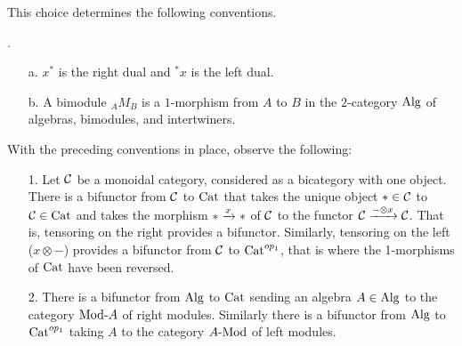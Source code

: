 \documentclass{amsart}
\begin{document}
This choice determines the following conventions.
\begin{definition}.
\begin{itemize}
\item[a.] $x^*$ is the right dual and ${}^*x$ is the left dual.
\item[b.] A bimodule ${}_A M_B$ is a $1$-morphism from $A$ to $B$ in the $2$-category $\mathrm{Alg}$ of algebras, bimodules, and intertwiners.
\end{itemize}
\end{definition}

\noindent With the preceding conventions in place, observe the following:
\begin{itemize}
\item[1.] Let $\mathcal C$ be a monoidal category, considered as a bicategory with one object.  There is a bifunctor from $\mathcal C$ to $\mathrm{Cat}$ that takes the unique object $\ast \in \mathcal C$ to $\mathcal C \in \mathrm{Cat}$ and takes the morphism $\ast \xrightarrow{x} \ast$ of $\mathcal C$ to the functor $\mathcal C \xrightarrow{- \otimes x} \mathcal C$.  That is, tensoring on the right provides a bifunctor.  Similarly, tensoring on the left ($x \otimes -$) provides a bifunctor from $\mathcal C$ to $\mathrm{Cat}^{op_1}$, that is where the 1-morphisms of $\mathrm{Cat}$ have been reversed.
\item[2.] There is a bifunctor from $\mathrm{Alg}$ to $\mathrm{Cat}$ sending an algebra $A \in \mathrm{Alg}$ to the category $\Mod{}{A}$ of right modules.  Similarly there is a bifunctor from $\mathrm{Alg}$ to $\mathrm{Cat}^{op_1}$ taking $A$ to the category $\Mod{A}{}$ of left modules.
\end{itemize}




\end{document}
